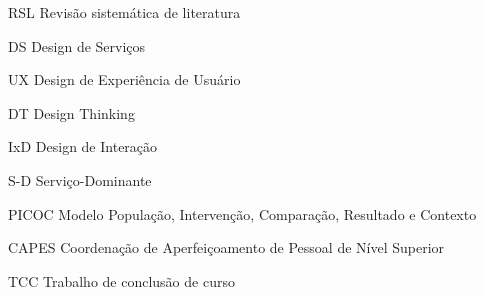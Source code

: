 \begin{siglas}
  \item[RSL] Revisão sistemática de literatura
  \item[DS] Design de Serviços
  \item[UX] Design de Experiência de Usuário
  \item[DT] Design Thinking
  \item[IxD] Design de Interação
  \item[S-D] Serviço-Dominante
  \item[PICOC] Modelo População, Intervenção, Comparação, Resultado e Contexto
  \item[CAPES] Coordenação de Aperfeiçoamento de Pessoal de Nível Superior
  \item[TCC] Trabalho de conclusão de curso

\end{siglas}
